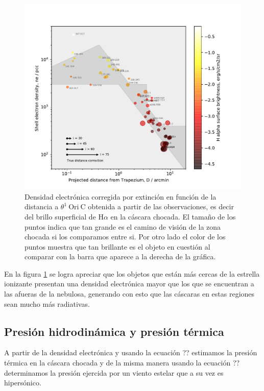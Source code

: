 \documentclass{article}
\newcommand\ha{\ensuremath{\mathrm{H}\alpha}}
\begin{document}
\begin{figure}
  \centering
   \includegraphics[width=\linewidth, clip]{luis-programas/will-nshell-vs-D.pdf}
  \caption{Densidad electrónica corregida por extinción en función de la distancia a \(\theta^1\ \text{Ori}\ \text{C}\) obtenida a partir de las observaciones, es decir del brillo superficial de \(\ha\) en la cáscara chocada. El tamaño de los puntos indica que tan grande es el camino de visión de la zona chocada si los comparamos entre si. Por otro lado el color de los puntos muestra que tan brillante es el objeto en cuestión al comparar con la barra que aparece a la derecha de la gráfica. }
  \label{fig:density}
\end{figure}

En la figura \ref{fig:density} se logra apreciar que los objetos que están más cercas de la estrella ionizante presentan una densidad electrónica mayor que los que se encuentran a las afueras de la nebulosa, generando con esto que las cáscaras en estas regiones sean mucho más radiativas.\\



\subsection{Presión hidrodinámica y presión térmica}
\label{sec:pressure}

A partir de la densidad electrónica y usando la ecuación ?? estimamos la presión térmica en la cáscara chocada y de la misma manera usando la ecuación ?? determinamos la presión ejercida por un viento estelar que a su vez es hipersónico.\\ 
\end{document}
